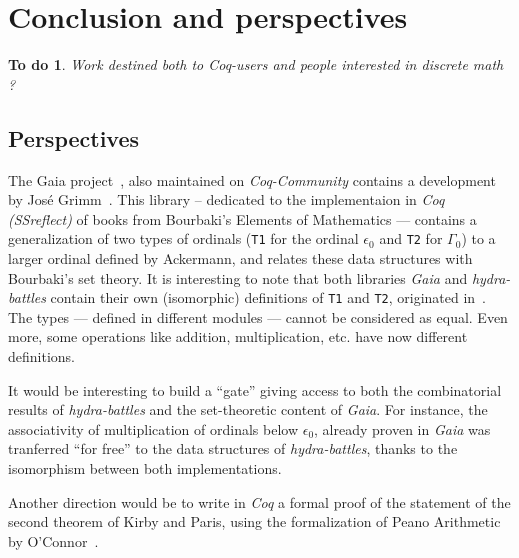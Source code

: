 \documentclass{easychair}
\newtheorem{todo}{To do}
\begin{document}
\section{Conclusion and perspectives}

\begin{todo}
  Work destined both to Coq-users and people interested in discrete math ?
 \end{todo}


\subsection{Perspectives}


The Gaia project~\cite{Gaia}, also maintained on \textit{Coq-Community} contains a development by José Grimm~\cite{grimm:hal-00911710}. This library -- dedicated  to the implementaion in \textit{Coq (SSreflect)} of books from  Bourbaki's Elements of Mathematics --- contains a generalization of two types of ordinals (\texttt{T1} for the ordinal $\epsilon_0$ and
\texttt{T2} for $\Gamma_0$) to a larger ordinal defined by Ackermann, and relates these data structures with Bourbaki's set theory.
It is interesting to note that both libraries \textit{Gaia} and \textit{hydra-battles} contain their own (isomorphic) definitions of
\texttt{T1} and \texttt{T2}, originated in~\cite{CantorContrib}.
The types --- defined in different modules --- cannot be considered as equal. Even more, some operations like addition, multiplication, etc. have now different definitions.

It would be interesting to build a ``gate'' giving access to both the combinatorial results of \textit{hydra-battles} and the set-theoretic content of \textit{Gaia}.
For instance, the associativity of multiplication of ordinals below $\epsilon_0$, already proven in \textit{Gaia} was tranferred ``for free'' to the data structures of \textit{hydra-battles}, thanks to the isomorphism between both implementations.

Another direction would be to write in \textit{Coq} a formal proof of the statement of the second theorem of Kirby and Paris, using the formalization of Peano Arithmetic by O'Connor~\cite{Goedel}.




\label{sect:bib}

%
%
%

\end{document}
